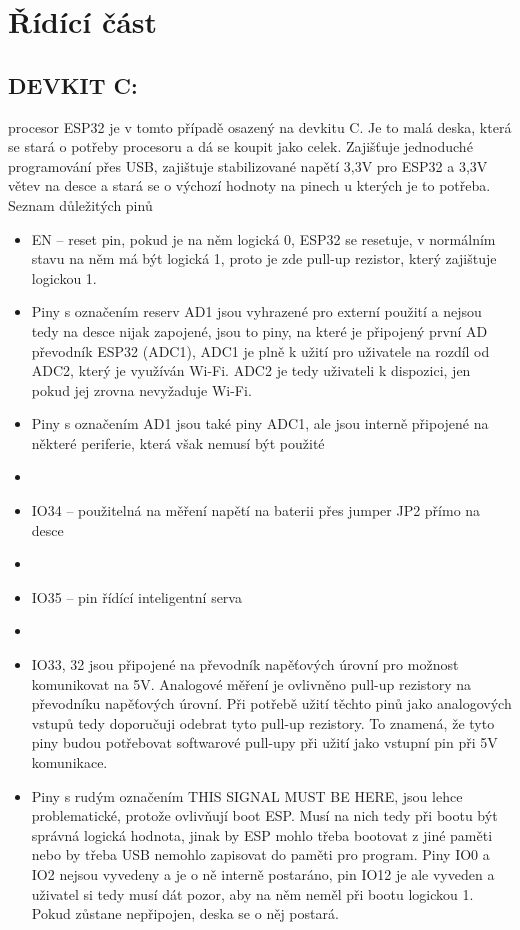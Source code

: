 \documentclass{template/socthesis}
\begin{document}
\chapter{Řídící část}
	
	\section{DEVKIT C:}
	procesor ESP32 je v tomto případě osazený na devkitu C. Je to malá deska, která se stará o potřeby procesoru a dá se koupit jako celek. Zajišťuje jednoduché programování přes USB, zajištuje stabilizované napětí 3,3V pro ESP32 a 3,3V větev na desce a stará se o výchozí hodnoty na pinech u kterých je to potřeba.
	Seznam důležitých pinů
	\begin{itemize}
	\item EN – reset pin, pokud je na něm logická 0, ESP32 se resetuje, v normálním stavu na něm má být logická 1, proto je zde pull-up rezistor, který zajištuje logickou 1.
	
	\item Piny s označením reserv AD1 jsou vyhrazené pro externí použití 
	a nejsou tedy na desce nijak zapojené, jsou to piny, na které je připojený 
	první AD převodník ESP32 (ADC1), ADC1 je plně k užití pro uživatele na rozdíl 
	od ADC2, který je využíván Wi-Fi. ADC2 je tedy uživateli k dispozici, jen pokud jej zrovna nevyžaduje Wi-Fi.
	
	\item Piny s označením AD1 jsou také piny ADC1, ale jsou interně připojené na některé periferie, která však nemusí být použité
	
	\item \item IO34 – použitelná na měření napětí na baterii přes jumper JP2 přímo na desce
	\item \item IO35 – pin řídící inteligentní serva
	\item \item IO33, 32 jsou připojené na převodník napěťových úrovní pro možnost komunikovat na 5V. Analogové měření je ovlivněno pull-up rezistory na převodníku napěťových úrovní. Při potřebě užití těchto pinů jako analogových vstupů tedy doporučuji odebrat tyto pull-up rezistory. 
	To znamená, že tyto piny budou potřebovat softwarové pull-upy při užití jako vstupní pin při 5V komunikace.
	\item Piny s rudým označením THIS SIGNAL MUST BE HERE, jsou lehce problematické, protože ovlivňují boot ESP. Musí na nich tedy při bootu být správná logická hodnota, jinak by ESP mohlo třeba bootovat z jiné paměti nebo by třeba USB nemohlo zapisovat do paměti pro program. Piny IO0 a IO2 nejsou vyvedeny a je o ně interně postaráno, pin IO12 je ale vyveden a uživatel si tedy musí dát pozor, aby na něm neměl při bootu logickou 1. Pokud zůstane nepřipojen, deska se o něj postará.
	

\end{itemize}
\end{document}
